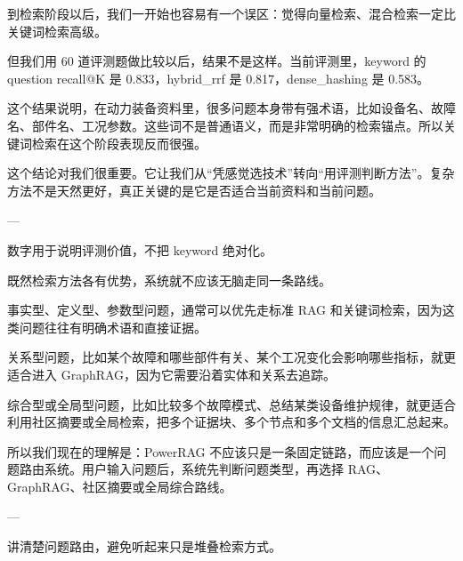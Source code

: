 \documentclass[10pt, a4paper]{ctexart}
\begin{document}
\begin{tcolorbox}[colback=white, colframe=primary!35, title={\textbf{第 11 页：检索不是越复杂越好}}, beforeafter skip=2.0pt]
\begin{minipage}[t]{0.72\textwidth}
  \linespread{1.0}\selectfont\footnotesize
  到检索阶段以后，我们一开始也容易有一个误区：觉得向量检索、混合检索一定比关键词检索高级。

但我们用 60 道评测题做比较以后，结果不是这样。当前评测里，keyword 的 question recall@K 是 0.833，hybrid\_rrf 是 0.817，dense\_hashing 是 0.583。

这个结果说明，在动力装备资料里，很多问题本身带有强术语，比如设备名、故障名、部件名、工况参数。这些词不是普通语义，而是非常明确的检索锚点。所以关键词检索在这个阶段表现反而很强。

这个结论对我们很重要。它让我们从“凭感觉选技术”转向“用评测判断方法”。复杂方法不是天然更好，真正关键的是它是否适合当前资料和当前问题。

---
\end{minipage}
\hfill
\begin{minipage}[t]{0.25\textwidth}
  \fontsize{7.5}{9.5}\selectfont
  \begin{tcolorbox}[colback=orange!5, colframe=orange!45, title=\textbf{讲述重点}, left=0.6mm, right=0.6mm, top=0.8mm, bottom=0.8mm, arc=0.8mm, boxrule=0.4pt, beforeafter skip=0pt]
    数字用于说明评测价值，不把 keyword 绝对化。
  \end{tcolorbox}
\end{minipage}
\end{tcolorbox}

\begin{tcolorbox}[colback=white, colframe=primary!35, title={\textbf{第 12 页：不同问题应该走不同路线}}, beforeafter skip=2.0pt]
\begin{minipage}[t]{0.72\textwidth}
  \linespread{1.0}\selectfont\footnotesize
  既然检索方法各有优势，系统就不应该无脑走同一条路线。

事实型、定义型、参数型问题，通常可以优先走标准 RAG 和关键词检索，因为这类问题往往有明确术语和直接证据。

关系型问题，比如某个故障和哪些部件有关、某个工况变化会影响哪些指标，就更适合进入 GraphRAG，因为它需要沿着实体和关系去追踪。

综合型或全局型问题，比如比较多个故障模式、总结某类设备维护规律，就更适合利用社区摘要或全局检索，把多个证据块、多个节点和多个文档的信息汇总起来。

所以我们现在的理解是：PowerRAG 不应该只是一条固定链路，而应该是一个问题路由系统。用户输入问题后，系统先判断问题类型，再选择 RAG、GraphRAG、社区摘要或全局综合路线。

---
\end{minipage}
\hfill
\begin{minipage}[t]{0.25\textwidth}
  \fontsize{7.5}{9.5}\selectfont
  \begin{tcolorbox}[colback=orange!5, colframe=orange!45, title=\textbf{讲述重点}, left=0.6mm, right=0.6mm, top=0.8mm, bottom=0.8mm, arc=0.8mm, boxrule=0.4pt, beforeafter skip=0pt]
    讲清楚问题路由，避免听起来只是堆叠检索方式。
  \end{tcolorbox}
\end{minipage}
\end{tcolorbox}
\end{document}

